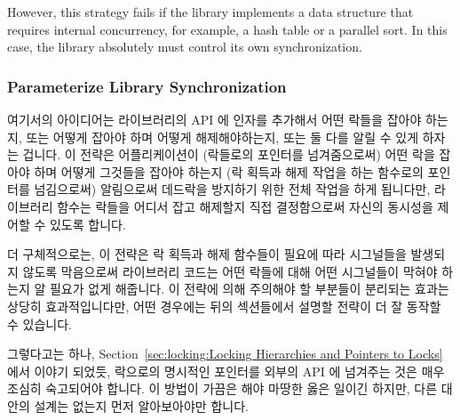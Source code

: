 However, this strategy fails if the
library implements a data structure that requires internal
concurrency, for example, a hash table or a parallel sort.
In this case, the library absolutely must control its own
synchronization.
\fi

\subsubsection{Parameterize Library Synchronization}
\label{sec:locking:Parameterize Library Synchronization}

여기서의 아이디어는 라이브러리의 API 에 인자를 추가해서 어떤 락들을 잡아야
하는지, 또는 어떻게 잡아야 하며 어떻게 해제해야하는지, 또는 둘 다를 알릴 수
있게 하자는 겁니다.
이 전략은 어플리케이션이 (락들로의 포인터를 넘겨줌으로써) 어떤 락을 잡아야 하며
어떻게 그것들을 잡아야 하는지 (락 획득과 해제 작업을 하는 함수로의 포인터를
넘김으로써) 알림으로써 데드락을 방지하기 위한 전체 작업을 하게 됩니다만,
라이브러리 함수는 락들을 어디서 잡고 해제할지 직접 결정함으로써 자신의 동시성을
제어할 수 있도록 합니다.

더 구체적으로는, 이 전략은 락 획득과 해제 함수들이 필요에 따라 시그널들을
발생되지 않도록 막음으로써 라이브러리 코드는 어떤 락들에 대해 어떤 시그널들이
막혀야 하는지 알 필요가 없게 해줍니다.
이 전략에 의해 주의해야 할 부분들이 분리되는 효과는 상당히 효과적입니다만, 어떤
경우에는 뒤의 섹션들에서 설명할 전략이 더 잘 동작할 수 있습니다.

그렇다고는 하나,
Section~\ref{sec:locking:Locking Hierarchies and Pointers to Locks} 에서 이야기
되었듯, 락으로의 명시적인 포인터를 외부의 API 에 넘겨주는 것은 매우 조심히
숙고되어야 합니다.
이 방법이 가끔은 해야 마땅한 옳은 일이긴 하지만, 다른 대안의 설계는 없는지 먼저
알아보아야만 합니다.
\iffalse

